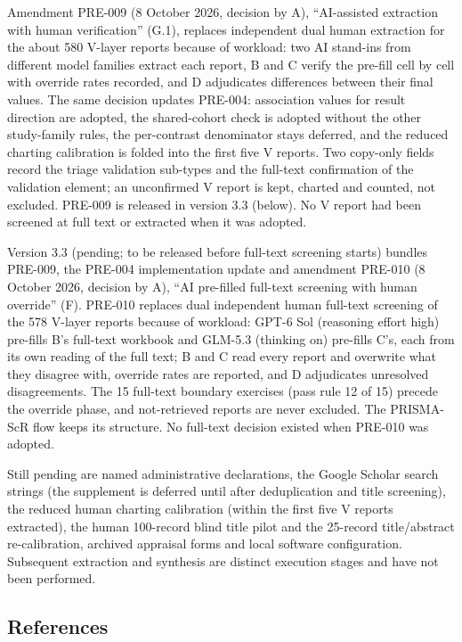 \documentclass[
  11pt,
  a4paper,
]{article}
\begin{document}
Amendment PRE-009 (8 October 2026, decision by A), ``AI-assisted
extraction with human verification'' (G.1), replaces independent dual
human extraction for the about 580 V-layer reports because of workload:
two AI stand-ins from different model families extract each report, B
and C verify the pre-fill cell by cell with override rates recorded, and
D adjudicates differences between their final values. The same decision
updates PRE-004: association values for result direction are adopted,
the shared-cohort check is adopted without the other study-family rules,
the per-contrast denominator stays deferred, and the reduced charting
calibration is folded into the first five V reports. Two copy-only
fields record the triage validation sub-types and the full-text
confirmation of the validation element; an unconfirmed V report is kept,
charted and counted, not excluded. PRE-009 is released in version 3.3
(below). No V report had been screened at full text or extracted when it
was adopted.

Version 3.3 (pending; to be released before full-text screening starts)
bundles PRE-009, the PRE-004 implementation update and amendment PRE-010
(8 October 2026, decision by A), ``AI pre-filled full-text screening
with human override'' (F). PRE-010 replaces dual independent human
full-text screening of the 578 V-layer reports because of workload:
GPT-6 Sol (reasoning effort high) pre-fills B's full-text workbook and
GLM-5.3 (thinking on) pre-fills C's, each from its own reading of the
full text; B and C read every report and overwrite what they disagree
with, override rates are reported, and D adjudicates unresolved
disagreements. The 15 full-text boundary exercises (pass rule 12 of 15)
precede the override phase, and not-retrieved reports are never
excluded. The PRISMA-ScR flow keeps its structure. No full-text decision
existed when PRE-010 was adopted.

Still pending are named administrative declarations, the Google Scholar
search strings (the supplement is deferred until after deduplication and
title screening), the reduced human charting calibration (within the
first five V reports extracted), the human 100-record blind title pilot
and the 25-record title/abstract re-calibration, archived appraisal
forms and local software configuration. Subsequent extraction and
synthesis are distinct execution stages and have not been performed.

\subsection{References}\label{references}
\end{document}
